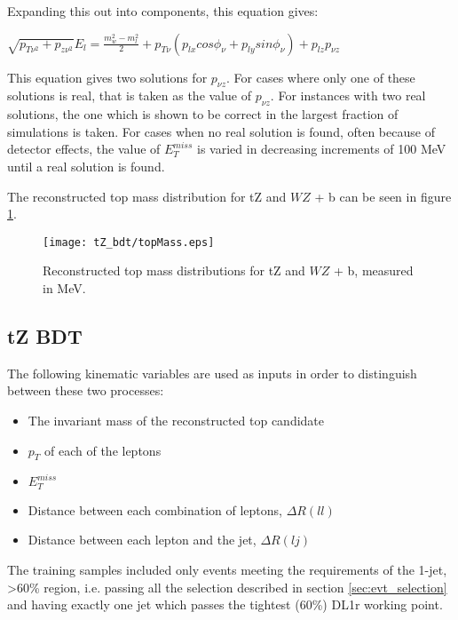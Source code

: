 Expanding this out into components, this equation gives:

\begin{center}
   $\sqrt{p_{T\nu^2}+p_{z\nu^2}}E_l = \frac{m^2_w-m^2_l}{2}+p_{T\nu}(p_{lx} cos\phi_\nu + p_{ly} sin \phi_\nu) + p_{lz} p_{\nu z}$ \\ 
\end{center} 

This equation gives two solutions for $p_{\nu z}$. For cases where only one of these solutions is real, that is taken as the value of $p_{\nu z}$. For instances with two real solutions, the one which is shown to be correct in the largest fraction of simulations is taken. For cases when no real solution is found, often because of detector effects, the value of $E_T^{miss}$ is varied in decreasing increments of 100 MeV until a real solution is found.

The reconstructed top mass distribution for tZ and $WZ$ + b can be seen in figure \ref{fig:topMass}.

\begin{figure}
    \centering
    \texttt{[image: tZ\_bdt/topMass.eps]}
    \caption{Reconstructed top mass distributions for tZ and $WZ$ + b, measured in MeV.}
    \label{fig:topMass}
\end{figure}

\subsection{tZ BDT}
\label{subsec:tZ_bdt}
 
The following kinematic variables are used as inputs in order to distinguish between these two processes:
 
 \begin{itemize}
     \item The invariant mass of the reconstructed top candidate
     \item $p_T$ of each of the leptons
     \item $E_T^{miss}$
     \item Distance between each combination of leptons, $\Delta R (ll)$
     \item Distance between each lepton and the jet, $\Delta R (lj)$
 \end{itemize}
 
The training samples included only events meeting the requirements of the 1-jet, >60\% region, i.e. passing all the selection described in section \ref{sec:evt_selection} and having exactly one jet which passes the tightest (60\%) DL1r working point. 
 
